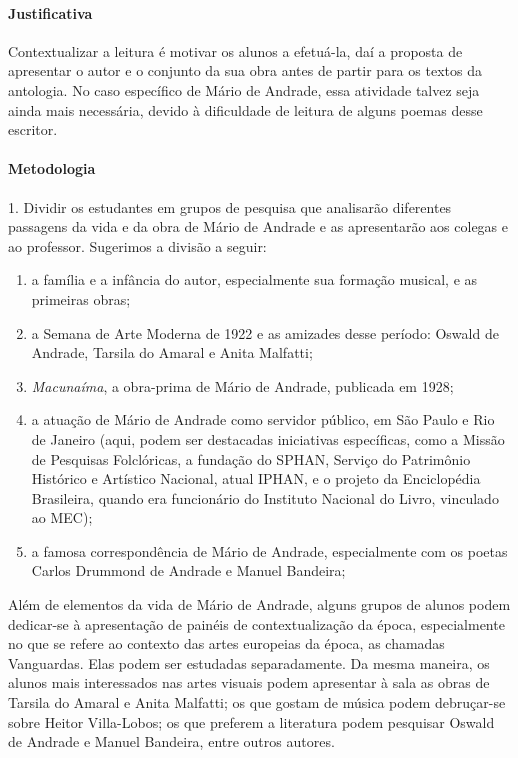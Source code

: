 \documentclass[11pt]{extarticle}
\begin{document}
\paragraph{Justificativa} Contextualizar a leitura é motivar os alunos a
efetuá-la, daí a proposta de apresentar o autor e o conjunto da sua obra
antes de partir para os textos da antologia. No caso específico de Mário
de Andrade, essa atividade talvez seja ainda mais necessária, devido à
dificuldade de leitura de alguns poemas desse escritor.

\paragraph{Metodologia}


1. Dividir os estudantes em grupos de pesquisa que analisarão diferentes
passagens da vida e da obra de Mário de Andrade e as apresentarão aos
colegas e ao professor. Sugerimos a divisão a seguir:

\begin{enumerate}
\item a família e a infância do autor, especialmente sua formação musical,
e as primeiras obras;

\item a Semana de Arte Moderna de 1922 e as amizades desse período: Oswald
de Andrade, Tarsila do Amaral e Anita Malfatti;

\item \emph{Macunaíma}, a obra-prima de Mário de Andrade, publicada em
1928;

\item a atuação de Mário de Andrade como servidor público, em São Paulo e
Rio de Janeiro (aqui, podem ser destacadas iniciativas específicas, como
a Missão de Pesquisas Folclóricas, a fundação do SPHAN, Serviço do
Patrimônio Histórico e Artístico Nacional, atual IPHAN, e o projeto da
Enciclopédia Brasileira, quando era funcionário do Instituto Nacional do
Livro, vinculado ao MEC);

\item a famosa correspondência de Mário de Andrade, especialmente com os
poetas Carlos Drummond de Andrade e Manuel Bandeira;
\end{enumerate}


Além de elementos da vida de Mário de Andrade, alguns grupos de alunos
podem dedicar-se à apresentação de painéis de contextualização da época,
especialmente no que se refere ao contexto das artes europeias da época,
as chamadas Vanguardas. Elas podem ser estudadas separadamente. Da mesma
maneira, os alunos mais interessados nas artes visuais podem apresentar
à sala as obras de Tarsila do Amaral e Anita Malfatti; os que gostam de
música podem debruçar-se sobre Heitor Villa-Lobos; os que preferem a
literatura podem pesquisar Oswald de Andrade e Manuel Bandeira, entre
outros autores.
\end{document}
